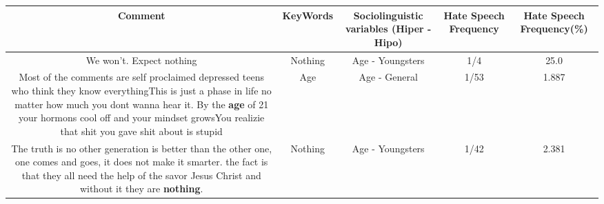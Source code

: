 \documentclass[11pt]{article}
\newlength\mylength
\begin{document}
\begin{center}
\setlength\mylength{\dimexpr\textwidth - 1\arrayrulewidth - 50\tabcolsep}
\begin{longtable}{|C{.65\mylength}|C{.30\mylength}|C{.12\mylength}|C{.12\mylength}|C{.12\mylength}|}
\hline
\textbf{Comment} & \textbf{KeyWords} & \textbf{Sociolinguistic variables (Hiper - Hipo)}  & \textbf{Hate Speech Frequency} & \textbf{Hate Speech Frequency(\%)} \\
\hline{}\small We won't. Expect nothing\normalsize   & Nothing & Age - Youngsters & 1/4 & 25.0 \\  \hline
  \small Most of the comments are self proclaimed depressed teens who think they know everythingThis is just a phase in life no matter how much you dont wanna hear it. By the \textbf{age} of 21 your hormons cool off and your mindset growsYou realizie that shit you gave shit about is stupid\normalsize   & Age & Age - General & 1/53 & 1.887 \\  \hline
  \small The truth is no other generation is better than the other one, one comes and goes, it does not make it smarter. the fact is that they all need the help of the savor Jesus Christ and without it they are \textbf{nothing}.\normalsize   & Nothing & Age - Youngsters & 1/42 & 2.381 \\  \hline

\end{longtable}
\end{center}
\end{document}
